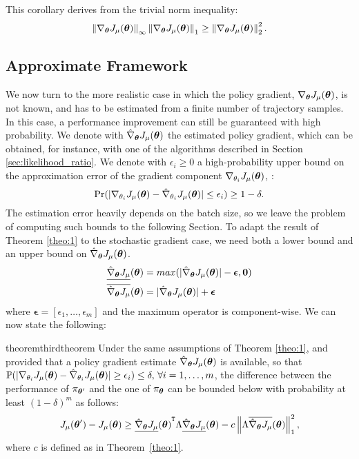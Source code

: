This corollary derives from the trivial norm inequality:
\[
\norm[\infty]{\gradJ{\vtheta}}\norm[1]{\gradJ{\vtheta}}
\geq \norm[2]{\gradJ{\vtheta}}^2.
\]


\subsection{Approximate Framework}\label{sec:approx}
We now turn to the more realistic case in which the policy gradient, $\gradJ{\vtheta}$, is not known, and has to be estimated from a finite number of trajectory samples. In this case, a performance improvement can still be guaranteed with high probability. 
We denote with $\gradApp{\vtheta}$ the estimated policy gradient, which can be obtained, for instance, with one of the algorithms described in Section \ref{sec:likelihood_ratio}.
We denote with $\epsilon_i \geq 0$ a high-probability upper bound on the approximation error of the gradient component $\gradJ{\theta_i}$, \ie:
\[
	\Pr(|\gradJ{\theta_i} - \gradApp{\theta_i}| \leq \epsilon_i) \geq 1-\delta.
\]
The estimation error heavily depends on the batch size, so we leave the problem of computing such bounds to the following Section.
To adapt the result of Theorem \ref{theo:1} to the stochastic gradient case, we need both a lower bound and an upper bound on $\gradApp{\vtheta}$.
\begin{align*}
\gradDown{\vtheta} &= max(|\gradApp{\vtheta}| - \boldsymbol{\epsilon},\boldsymbol{0}) \\
\gradUp{\vtheta} &= |\gradApp{\vtheta}| + \boldsymbol{\epsilon}
\end{align*}
where $\boldsymbol{\epsilon}=[\epsilon_1,\dotsc,\epsilon_m]$ and the maximum operator is component-wise.
We can now state the following: 

\begin{restatable}{theorem}{thirdtheorem}\label{theo:3}
Under the same assumptions of Theorem \ref{theo:1}, and provided that a policy gradient estimate $\gradApp{\vtheta}$ is available, so that $\mathbb{P}(|\gradJ{\theta_i}-\gradApp{\theta_i}| \geq \epsilon_i) \leq \delta, \, \forall i=1,\dotsc,m$, the difference between the performance of $\pi_{\vtheta'}$ and the one of $\pi_ {\vtheta}$ can be bounded below with probability at least $(1-\delta)^m$ as follows:
\[
\DeltaJ \geq \transpose{\gradDown{\vtheta}}\Lambda\gradDown{\vtheta} - 				 c\norm[1]{\Lambda\gradUp{\vtheta}}^2,
\]
where $c$ is defined as in Theorem~\ref{theo:1}.
\end{restatable}

